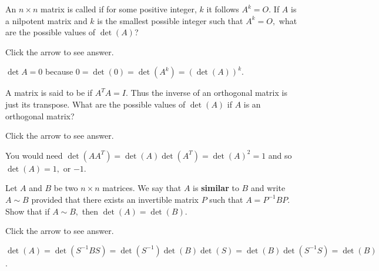 \documentclass{ximera}
\begin{document}
\begin{problem}\label{prb:7.18} An $n\times n$ matrix is called 
if for some positive integer, $k$ it follows $A^{k}=O.$ If
$A$ is a nilpotent matrix and $k$ is the smallest possible integer such that
$A^{k}=O,$ what are the possible values of $\det \left( A\right)$?

Click the arrow to see answer.
\begin{expandable}{}{}
$\det{A}=0$ because $0=\det \left( 0\right) =\det \left( A^{k}\right) =\left( \det
\left( A\right) \right) ^{k}.$
\end{expandable}
\end{problem}

\begin{problem}\label{prb:7.19}A matrix is said to be  if
$A^{T}A=I.$ Thus the inverse of an orthogonal matrix is just its transpose.
What are the possible values of $\det \left( A\right) $ if $A$ is an
orthogonal matrix?

Click the arrow to see answer.
\begin{expandable}{}{}
You would need $\det \left( AA^{T}\right) =\det
\left( A\right) \det \left( A^{T}\right) =\det \left( A\right) ^{2}=1$ and
so $\det \left( A\right) =1,$ or $-1$.
\end{expandable}
\end{problem}

\begin{problem}\label{prb:7.20} Let $A$ and $B$ be two $n\times n$ matrices. We say that $A$ is \textbf{similar} to $B$ and write $A\sim B$
provided that there exists an invertible matrix $P$
such that $A=P^{-1}BP.$ Show that if $A\sim B,$ then
$\det \left( A\right) =\det \left( B\right)$.

Click the arrow to see answer.
\begin{expandable}{}{}
$\det \left( A\right) =\det
\left( S^{-1}BS\right) =\det \left( S^{-1}\right) \det \left( B\right) \det
\left( S\right) =\det \left( B\right) \det \left( S^{-1}S\right) =\det
\left( B\right) $.
\end{expandable}
\end{problem}
\end{document}
